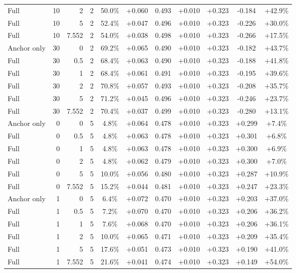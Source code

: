 \begin{table}[htbp]
\begin{tabular}{lrrrccccccc}
Full & 10 & 2 & 2 & 50.0\% & +0.060 & 0.493 & +0.010 & +0.323 & -0.184 & +42.9\% \\
Full & 10 & 5 & 2 & 52.4\% & +0.047 & 0.496 & +0.010 & +0.323 & -0.226 & +30.0\% \\
Full & 10 & 7.552 & 2 & 54.0\% & +0.038 & 0.498 & +0.010 & +0.323 & -0.266 & +17.5\% \\
Anchor only & 30 & 0 & 2 & 69.2\% & +0.065 & 0.490 & +0.010 & +0.323 & -0.182 & +43.7\% \\
Full & 30 & 0.5 & 2 & 68.4\% & +0.063 & 0.490 & +0.010 & +0.323 & -0.188 & +41.8\% \\
Full & 30 & 1 & 2 & 68.4\% & +0.061 & 0.491 & +0.010 & +0.323 & -0.195 & +39.6\% \\
Full & 30 & 2 & 2 & 70.8\% & +0.057 & 0.493 & +0.010 & +0.323 & -0.208 & +35.7\% \\
Full & 30 & 5 & 2 & 71.2\% & +0.045 & 0.496 & +0.010 & +0.323 & -0.246 & +23.7\% \\
Full & 30 & 7.552 & 2 & 70.4\% & +0.037 & 0.499 & +0.010 & +0.323 & -0.280 & +13.1\% \\
Anchor only & 0 & 0 & 5 & 4.8\% & +0.064 & 0.478 & +0.010 & +0.323 & +0.299 & +7.4\% \\
Full & 0 & 0.5 & 5 & 4.8\% & +0.063 & 0.478 & +0.010 & +0.323 & +0.301 & +6.8\% \\
Full & 0 & 1 & 5 & 4.8\% & +0.063 & 0.478 & +0.010 & +0.323 & +0.300 & +6.9\% \\
Full & 0 & 2 & 5 & 4.8\% & +0.062 & 0.479 & +0.010 & +0.323 & +0.300 & +7.0\% \\
Full & 0 & 5 & 5 & 10.0\% & +0.056 & 0.480 & +0.010 & +0.323 & +0.287 & +10.9\% \\
Full & 0 & 7.552 & 5 & 15.2\% & +0.044 & 0.481 & +0.010 & +0.323 & +0.247 & +23.3\% \\
Anchor only & 1 & 0 & 5 & 6.4\% & +0.072 & 0.470 & +0.010 & +0.323 & +0.203 & +37.0\% \\
Full & 1 & 0.5 & 5 & 7.2\% & +0.070 & 0.470 & +0.010 & +0.323 & +0.206 & +36.2\% \\
Full & 1 & 1 & 5 & 7.6\% & +0.068 & 0.470 & +0.010 & +0.323 & +0.206 & +36.1\% \\
Full & 1 & 2 & 5 & 10.0\% & +0.065 & 0.471 & +0.010 & +0.323 & +0.209 & +35.4\% \\
Full & 1 & 5 & 5 & 17.6\% & +0.051 & 0.473 & +0.010 & +0.323 & +0.190 & +41.0\% \\
Full & 1 & 7.552 & 5 & 21.6\% & +0.041 & 0.474 & +0.010 & +0.323 & +0.149 & +54.0\% \\

\end{tabular}
\end{table}
